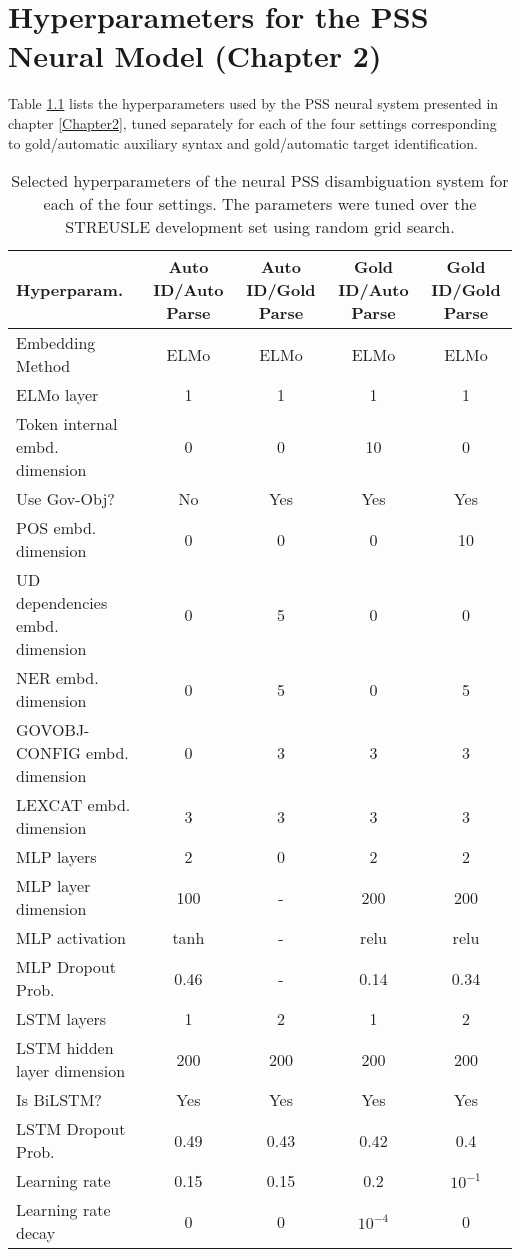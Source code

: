 
\chapter{Hyperparameters for the PSS Neural Model (Chapter 2)} %

\label{AppendixA} %

Table \ref{tab:hyperparamsA} lists the hyperparameters used by the
PSS neural system presented in chapter \ref{Chapter2}, tuned separately for each of the four settings corresponding to gold/automatic auxiliary syntax and gold/automatic target identification.

\begin{table}[]
  \small
	\centering
	\begin{tabular}{@{}l|cccc@{}}
		\toprule
		Hyperparam. & Auto ID/Auto Parse & Auto ID/Gold Parse & Gold ID/Auto Parse & Gold ID/Gold Parse\\
		\midrule
        Embedding Method & ELMo & ELMo & ELMo & ELMo \\
        ELMo layer & 1 & 1 & 1 & 1 \\
        Token internal embd. dimension & 0 & 0 & 10 & 0 \\
        Use Gov-Obj? & No & Yes & Yes & Yes \\
        POS embd. dimension  & 0 & 0 & 0 & 10 \\
        UD dependencies embd. dimension  & 0 & 5 & 0 & 0 \\
        NER  embd. dimension  & 0 & 5 & 0 & 5 \\
        GOVOBJ-CONFIG embd. dimension  & 0 & 3 & 3 & 3 \\
        LEXCAT embd. dimension  & 3 & 3 & 3 & 3 \\
        MLP layers  & 2 & 0 & 2 & 2 \\
        MLP layer dimension  & 100 & - & 200 & 200 \\
        MLP activation  & tanh & - & relu & relu \\
        MLP Dropout Prob.  & 0.46 & - & 0.14 & 0.34 \\
        LSTM layers  & 1 & 2 & 1 & 2 \\
        LSTM hidden layer dimension  & 200 & 200 & 200 & 200 \\
        Is BiLSTM? & Yes & Yes & Yes & Yes \\
        LSTM Dropout Prob.  & 0.49 & 0.43 & 0.42 & 0.4 \\
        Learning rate  & 0.15 & 0.15 & 0.2 & $10^{-1}$ \\
        Learning rate decay  & 0 & 0 & $10^{-4}$ & 0 \\
		\bottomrule
	\end{tabular}
	\caption{\label{tab:hyperparamsA}
        Selected hyperparameters of the neural PSS disambiguation system for each of the four settings. The parameters were tuned over the STREUSLE development set using random grid search.
	}

\end{table}
